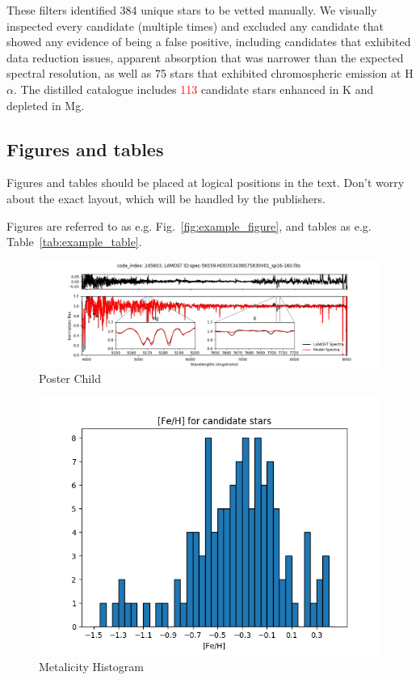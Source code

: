 \documentclass[a4paper,fleqn,usenatbib]{mnras}
\newcommand{\todo}[1]{\textcolor{red}{#1}}
\begin{document}
These filters identified 384 unique stars to be vetted manually. We visually inspected every candidate (multiple times) and excluded any candidate that showed any evidence of being a false positive, including candidates that exhibited data reduction issues, apparent absorption that was narrower than the expected spectral resolution, as well as 75 stars that exhibited chromospheric emission at H$\alpha$. The distilled catalogue includes \todo{113} candidate stars enhanced in K and depleted in Mg.


\subsection{Figures and tables}

Figures and tables should be placed at logical positions in the text. Don't
worry about the exact layout, which will be handled by the publishers.

Figures are referred to as e.g. Fig.~\ref{fig:example_figure}, and tables as
e.g. Table~\ref{tab:example_table}.




\begin{figure}
	\includegraphics[width=\columnwidth]{posterchildof13.png}
    \caption{Poster Child}
    \label{mhist}
\end{figure}

\begin{figure}
	\includegraphics[width=\columnwidth]{histof113.png}
    \caption{Metalicity Histogram}
    \label{mhist}
\end{figure}
\end{document}
